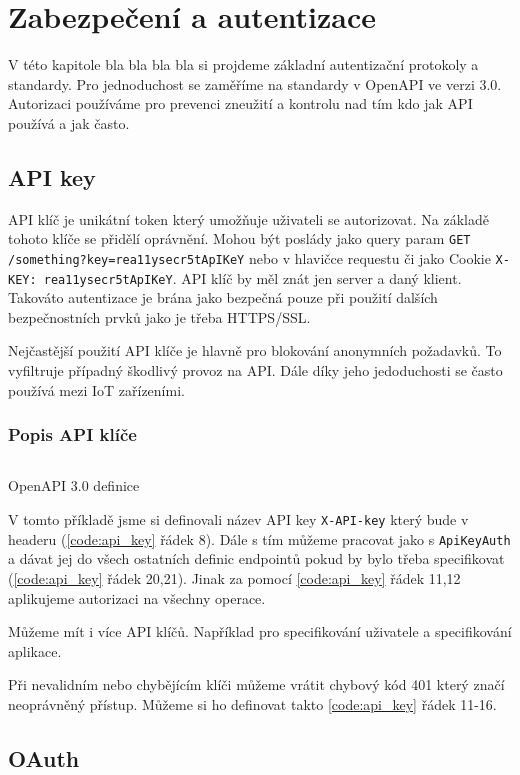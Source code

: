 \chapter{Zabezpečení a autentizace}
V této kapitole bla bla bla bla si projdeme základní autentizační protokoly a standardy.
Pro jednoduchost se zaměříme na standardy v OpenAPI ve verzi 3.0.
Autorizaci používáme pro prevenci zneužití a kontrolu nad tím kdo jak API používá a jak často.

\section{API key}
API klíč je unikátní token který umožňuje uživateli se autorizovat. Na základě tohoto klíče se přidělí oprávnění. Mohou být poslády jako query param  \texttt{GET /something?key=rea11ysecr5tApIKeY} nebo v hlavičce requestu či jako Cookie \texttt{X-KEY: rea11ysecr5tApIKeY}. API klíč by měl znát jen server a daný klient. Takováto autentizace je brána jako bezpečná pouze při použití dalších bezpečnostních prvků jako je třeba HTTPS/SSL.

Nejčastější použití API klíče je hlavně pro blokování anonymních požadavků. To vyfiltruje případný škodlivý provoz na API. Dále díky jeho jedoduchosti se často používá mezi IoT zařízeními.

\subsection{Popis API klíče}
\begin{listing}[ht]
    \inputminted[]{yaml}{resources/code/security/openapi-key.yml}
    \caption{OpenAPI 3.0 definice}
    \label{code:api_key}
\end{listing}

V tomto příkladě jsme si definovali název API key \texttt{X-API-key} který bude v headeru (\ref{code:api_key} řádek 8). Dále s tím můžeme pracovat jako s \texttt{ApiKeyAuth} a dávat jej do všech ostatních definic endpointů pokud by bylo třeba specifikovat (\ref{code:api_key} řádek 20,21). Jinak za pomocí \ref{code:api_key} řádek 11,12 aplikujeme autorizaci na všechny operace.


Můžeme mít i více API klíčů. Například pro specifikování uživatele a specifikování aplikace.

Při nevalidním nebo chybějícím klíči můžeme vrátit chybový kód 401 který značí neoprávněný přístup. Můžeme si ho definovat takto \ref{code:api_key} řádek 11-16.

\section{OAuth}



